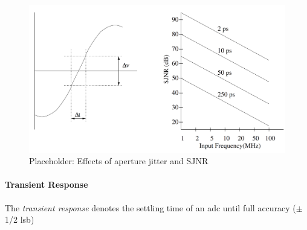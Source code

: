 \begin{figure}[tbh]
	\centering
	\includegraphics[width = \textwidth]{chap/02-theory/img/ap_jit}
	\caption{Placeholder: Effects of aperture jitter and SJNR \cite{Lundberg}}
	\label{fig:ap_jit}
\end{figure}

\paragraph{Transient Response}
The \textit{transient response} denotes the settling time of an \gls{adc} until full accuracy ($\pm$ 1/2 \gls{lsb})



